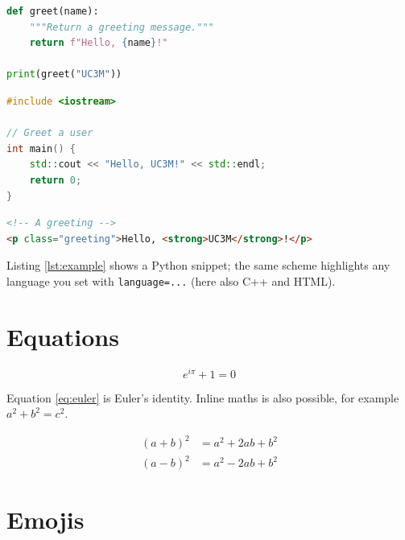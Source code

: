 \begin{lstlisting}[language=Python,caption={A simple Python function},label={lst:example}]
def greet(name):
    """Return a greeting message."""
    return f"Hello, {name}!"

print(greet("UC3M"))
\end{lstlisting}

\begin{lstlisting}[language=C++,caption={A simple C++ function}]
#include <iostream>

// Greet a user
int main() {
    std::cout << "Hello, UC3M!" << std::endl;
    return 0;
}
\end{lstlisting}

\begin{lstlisting}[language=HTML,caption={A simple HTML snippet}]
<!-- A greeting -->
<p class="greeting">Hello, <strong>UC3M</strong>!</p>
\end{lstlisting}

Listing \ref{lst:example} shows a Python snippet; the same scheme highlights
any language you set with \texttt{language=...} (here also C++ and HTML).



\section{Equations}

\begin{equation}
    \label{eq:euler}
    e^{i\pi} + 1 = 0
\end{equation}

Equation \ref{eq:euler} is Euler's identity. Inline maths is also possible,
for example $a^2 + b^2 = c^2$.

\begin{align}
  (a+b)^2 &= a^2 + 2ab + b^2 \\
  (a-b)^2 &= a^2 - 2ab + b^2
\end{align}



\section{Emojis}


